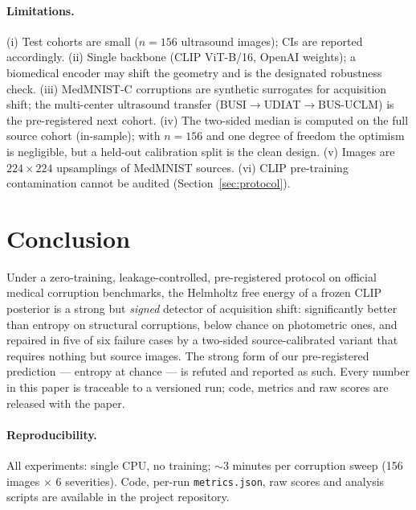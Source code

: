 \documentclass[11pt]{article}
\begin{document}
\paragraph{Limitations.} (i) Test cohorts are small ($n=156$ ultrasound
images); CIs are reported accordingly. (ii) Single backbone (CLIP ViT-B/16,
OpenAI weights); a biomedical encoder \citep{zhang2023biomedclip} may shift
the geometry and is the designated robustness check. (iii) MedMNIST-C
corruptions are synthetic surrogates for acquisition shift; the multi-center
ultrasound transfer (BUSI$\to$UDIAT$\to$BUS-UCLM) is the pre-registered next
cohort. (iv) The two-sided median is computed on the full source cohort
(in-sample); with $n=156$ and one degree of freedom the optimism is
negligible, but a held-out calibration split is the clean design. (v) Images
are $224\times224$ upsamplings of MedMNIST sources. (vi) CLIP pre-training
contamination cannot be audited (Section~\ref{sec:protocol}).

\section{Conclusion}

Under a zero-training, leakage-controlled, pre-registered protocol on official
medical corruption benchmarks, the Helmholtz free energy of a frozen CLIP
posterior is a strong but \emph{signed} detector of acquisition shift:
significantly better than entropy on structural corruptions, below chance on
photometric ones, and repaired in five of six failure cases by a two-sided
source-calibrated variant that requires nothing but source images. The strong
form of our pre-registered prediction --- entropy at chance --- is refuted and
reported as such. Every number in this paper is traceable to a versioned run;
code, metrics and raw scores are released with the paper.

\paragraph{Reproducibility.} All experiments: single CPU, no training;
$\sim$3 minutes per corruption sweep (156 images $\times$ 6 severities).
Code, per-run \texttt{metrics.json}, raw scores and analysis scripts are
available in the project repository.



\end{document}
